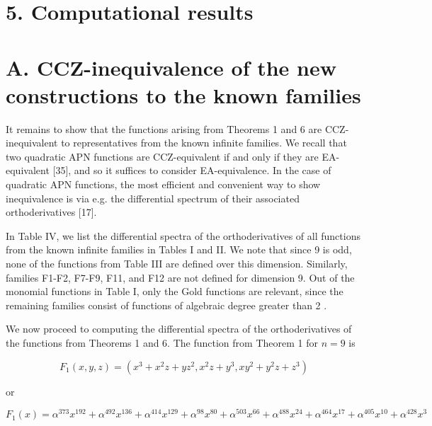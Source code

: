 \documentclass[10pt]{article}
\begin{document}
\section*{5. Computational results}
\section*{A. CCZ-inequivalence of the new constructions to the known families}
It remains to show that the functions arising from Theorems 1 and 6 are CCZ-inequivalent to representatives from the known infinite families. We recall that two quadratic APN functions are CCZ-equivalent if and only if they are EA-equivalent [35], and so it suffices to consider EA-equivalence. In the case of quadratic APN functions, the most efficient and convenient way to show inequivalence is via e.g. the differential spectrum of their associated orthoderivatives [17].

In Table IV, we list the differential spectra of the orthoderivatives of all functions from the known infinite families in Tables I and II. We note that since 9 is odd, none of the functions from Table III are defined over this dimension. Similarly, families F1-F2, F7-F9, F11, and F12 are not defined for dimension 9. Out of the monomial functions in Table I, only the Gold functions are relevant, since the remaining families consist of functions of algebraic degree greater than 2 .

We now proceed to computing the differential spectra of the orthoderivatives of the functions from Theorems 1 and 6. The function from Theorem 1 for $n=9$ is

$$
F_{1}(x, y, z)=\left(x^{3}+x^{2} z+y z^{2}, x^{2} z+y^{3}, x y^{2}+y^{2} z+z^{3}\right)
$$

or

$$
F_{1}(x)=\alpha^{373} x^{192}+\alpha^{492} x^{136}+\alpha^{414} x^{129}+\alpha^{98} x^{80}+\alpha^{503} x^{66}+\alpha^{488} x^{24}+\alpha^{464} x^{17}+\alpha^{405} x^{10}+\alpha^{428} x^{3}
$$
\end{document}
